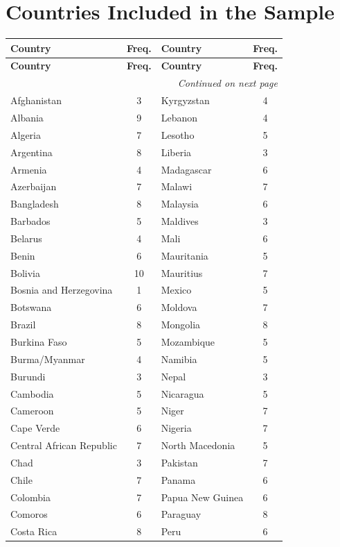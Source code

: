 \documentclass[USletter,12pt, titlepage]{article} %
\begin{document}
\section{Countries Included in the Sample}
\begin{center}
\begin{longtable}{lc|lc}
\toprule
\textbf{Country} & \textbf{Freq.} & \textbf{Country} & \textbf{Freq.} \\
\midrule
\endfirsthead
\toprule
\textbf{Country} & \textbf{Freq.} & \textbf{Country} & \textbf{Freq.} \\
\midrule
\endhead
\midrule
\multicolumn{4}{r}{\textit{Continued on next page}} \\
\endfoot
\bottomrule
\endlastfoot
Afghanistan & 3 & Kyrgyzstan & 4 \\
Albania & 9 & Lebanon & 4 \\
Algeria & 7 & Lesotho & 5 \\
Argentina & 8 & Liberia & 3 \\
Armenia & 4 & Madagascar & 6 \\
Azerbaijan & 7 & Malawi & 7 \\
Bangladesh & 8 & Malaysia & 6 \\
Barbados & 5 & Maldives & 3 \\
Belarus & 4 & Mali & 6 \\
Benin & 6 & Mauritania & 5 \\
Bolivia & 10 & Mauritius & 7 \\
Bosnia and Herzegovina & 1 & Mexico & 5 \\
Botswana & 6 & Moldova & 7 \\
Brazil & 8 & Mongolia & 8 \\
Burkina Faso & 5 & Mozambique & 5 \\
Burma/Myanmar & 4 & Namibia & 5 \\
Burundi & 3 & Nepal & 3 \\
Cambodia & 5 & Nicaragua & 5 \\
Cameroon & 5 & Niger & 7 \\
Cape Verde & 6 & Nigeria & 7 \\
Central African Republic & 7 & North Macedonia & 5 \\
Chad & 3 & Pakistan & 7 \\
Chile & 7 & Panama & 6 \\
Colombia & 7 & Papua New Guinea & 6 \\
Comoros & 6 & Paraguay & 8 \\
Costa Rica & 8 & Peru & 6 \\

\end{longtable}
\end{center}
\end{document}
